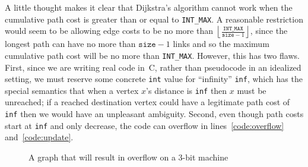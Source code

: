 A little thought makes it clear that Dijkstra's algorithm cannot work when the cumulative path
cost is greater than or equal to \texttt{INT\_MAX}.  A reasonable restriction would seem to be
allowing edge costs to be no more than $\left\lfloor\frac{\texttt{INT\_MAX}}{\texttt{size}-1}\right\rfloor$, since the longest path can have no more than $\texttt{size}-1$ links and so the maximum cumulative path cost will be no more than \texttt{INT\_MAX}.  However, this has two flaws.  First, since we are writing real code in~C, rather than pseudocode in an idealized setting, we must reserve some concrete \texttt{int} value for ``infinity'' \texttt{inf}, which has the special semantics that when a vertex $x$'s distance is \texttt{inf} then $x$ must be unreached; if a reached destination vertex could have a legitimate path cost of \texttt{inf} then we would have an unpleasant ambiguity.  Second, even though path costs start at \texttt{inf} and only decrease, the code can overflow in lines~\ref{code:overflow} and~\ref{code:update}.

\begin{figure}[t]
\centering
{}
\caption{A graph that will result in overflow on a 3-bit machine}
\label{fig:overflow}
\end{figure}

